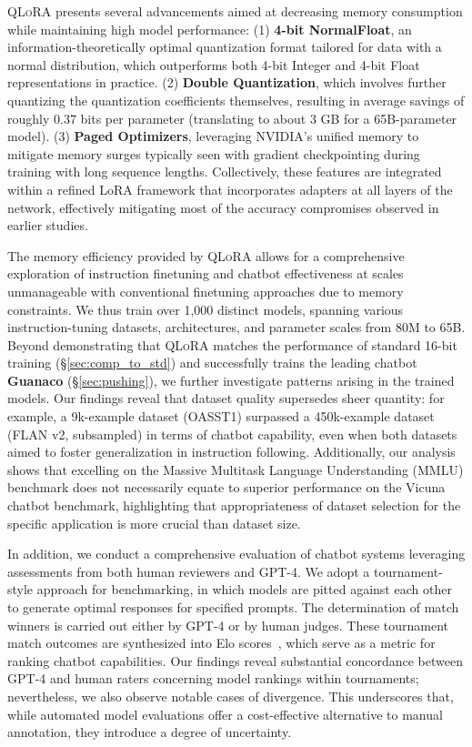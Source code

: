 \textsc{QLoRA} presents several advancements aimed at decreasing memory consumption while maintaining high model performance: (1) \textbf{4-bit NormalFloat}, an information-theoretically optimal quantization format tailored for data with a normal distribution, which outperforms both 4-bit Integer and 4-bit Float representations in practice. (2) \textbf{Double Quantization}, which involves further quantizing the quantization coefficients themselves, resulting in average savings of roughly 0.37 bits per parameter (translating to about 3 GB for a 65B-parameter model). (3) \textbf{Paged Optimizers}, leveraging NVIDIA's unified memory to mitigate memory surges typically seen with gradient checkpointing during training with long sequence lengths. Collectively, these features are integrated within a refined LoRA framework that incorporates adapters at all layers of the network, effectively mitigating most of the accuracy compromises observed in earlier studies.

The memory efficiency provided by \textsc{QLoRA} allows for a comprehensive exploration of instruction finetuning and chatbot effectiveness at scales unmanageable with conventional finetuning approaches due to memory constraints. We thus train over 1,000 distinct models, spanning various instruction-tuning datasets, architectures, and parameter scales from 80M to 65B. Beyond demonstrating that \textsc{QLoRA} matches the performance of standard 16-bit training (\S\ref{sec:comp_to_std}) and successfully trains the leading chatbot \textbf{Guanaco} (\S\ref{sec:pushing}), we further investigate patterns arising in the trained models. Our findings reveal that dataset quality supersedes sheer quantity: for example, a 9k-example dataset (OASST1) surpassed a 450k-example dataset (FLAN v2, subsampled) in terms of chatbot capability, even when both datasets aimed to foster generalization in instruction following. Additionally, our analysis shows that excelling on the Massive Multitask Language Understanding (MMLU) benchmark does not necessarily equate to superior performance on the Vicuna chatbot benchmark, highlighting that appropriateness of dataset selection for the specific application is more crucial than dataset size.

In addition, we conduct a comprehensive evaluation of chatbot systems leveraging assessments from both human reviewers and GPT-4. We adopt a tournament-style approach for benchmarking, in which models are pitted against each other to generate optimal responses for specified prompts. The determination of match winners is carried out either by GPT-4 or by human judges. These tournament match outcomes are synthesized into Elo scores~\citep{elo1967proposed, elo1978rating}, which serve as a metric for ranking chatbot capabilities. Our findings reveal substantial concordance between GPT-4 and human raters concerning model rankings within tournaments; nevertheless, we also observe notable cases of divergence. This underscores that, while automated model evaluations offer a cost-effective alternative to manual annotation, they introduce a degree of uncertainty.

